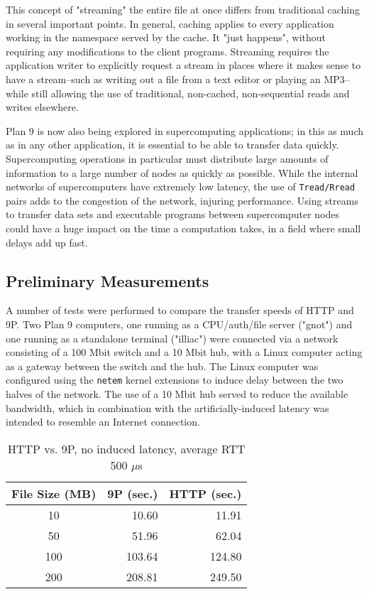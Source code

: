 \documentclass[12pt,american]{report}
\begin{document}
This concept of "streaming" the entire file at once differs from traditional caching in several important points. In general, caching applies to every application working in the namespace served by the cache. It "just happens", without requiring any modifications to the client programs. Streaming requires the application writer to explicitly request a stream in places where it makes sense to have a stream--such as writing out a file from a text editor or playing an MP3--while still allowing the use of traditional, non-cached, non-sequential reads and writes elsewhere.

Plan 9 is now also being explored in supercomputing applications; in this as much as in any other application, it is essential to be able to transfer data quickly. Supercomputing operations in particular must distribute large amounts of information to a large number of nodes as quickly as possible. While the internal networks of supercomputers have extremely low latency, the use of {\tt Tread/Rread} pairs adds to the congestion of the network, injuring performance. Using streams to transfer data sets and executable programs between supercomputer nodes could have a huge impact on the time a computation takes, in a field where small delays add up fast.

\subsection{Preliminary Measurements}
A number of tests were performed to compare the transfer speeds of HTTP and 9P. Two Plan 9 computers, one running as a CPU/auth/file server ("gnot") and one running as a standalone terminal ("illiac") were connected via a network consisting of a 100 Mbit switch and a 10 Mbit hub, with a Linux computer acting as a gateway between the switch and the hub. The Linux computer was configured using the {\tt netem} kernel extensions to induce delay between the two halves of the network. The use of a 10 Mbit hub served to reduce the available bandwidth, which in combination with the artificially-induced latency was intended to resemble an Internet connection.

\begin{table}[h]
	\begin{center}
		\begin{tabular}{ | c || r | r | }
			\hline
			\bf{File Size (MB)} & \bf{9P (sec.)} & \bf{HTTP (sec.)} \\ \hline
			10 & 10.60 & 11.91 \\ \hline
			50 & 51.96 & 62.04 \\ \hline
			100 & 103.64 & 124.80 \\ \hline
			200 & 208.81 & 249.50 \\ \hline		
		\end{tabular}
	\end{center}
	\caption{HTTP vs. 9P, no induced latency, average RTT 500 $\mu$s}
	\label{table:nolatency}
\end{table}
\end{document}
